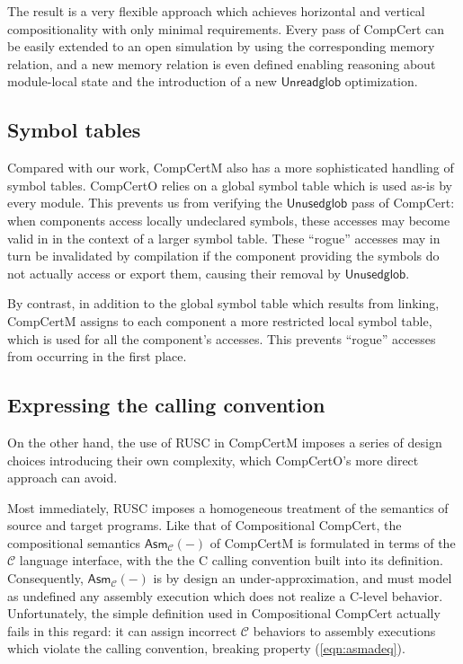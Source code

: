 \documentclass[sigplan,screen,review]{acmart}
\newcommand{\kw}[1]{\ensuremath{ \mathsf{#1} }}
\newenvironment{optional}{}{}
\begin{document}
\begin{optional}
The result is a very flexible approach
which achieves horizontal and vertical compositionality
with only minimal requirements.
Every pass of CompCert can be easily
extended to an open simulation
by using the corresponding memory relation,
and a new memory relation is even defined
enabling reasoning about module-local state
and the introduction of a new \kw{Unreadglob} optimization.


\subsection{Symbol tables} %

Compared with our work,
CompCertM also has a more sophisticated handling
of symbol tables.
CompCertO relies on a global symbol table
which is used as-is by every module.
This prevents us
from verifying the \kw{Unusedglob} pass of CompCert:
when components access locally undeclared symbols,
these accesses may become valid in
in the context of a larger symbol table.
These ``rogue'' accesses may in turn be invalidated by compilation
if the component providing the symbols
do not actually access or export them,
causing their removal by \kw{Unusedglob}.

By contrast,
in addition to the global symbol table which results from linking,
CompCertM assigns to each component
a more restricted local symbol table,
which is used for all the component's accesses.
This prevents ``rogue'' accesses
from occurring in the first place.


\subsection{Expressing the calling convention} %

On the other hand,
the use of RUSC in CompCertM imposes a series of design choices
introducing their own complexity,
which CompCertO's more direct approach can avoid.

Most immediately,
RUSC imposes a homogeneous
treatment of the semantics of source and target programs.
Like that of Compositional CompCert,
the compositional semantics $\kw{Asm}_\mathcal{C}(-)$
of CompCertM
is formulated in terms of the $\mathcal{C}$ language interface,
with the the C calling convention built into its definition.
Consequently, $\kw{Asm}_\mathcal{C}(-)$ is by design an under-approximation,
and must model as undefined any assembly execution
which does not realize a C-level behavior.
Unfortunately,
the simple definition used in Compositional CompCert
actually fails in this regard:
it can assign incorrect $\mathcal{C}$ behaviors
to assembly executions which violate the calling convention,
breaking property (\ref{eqn:asmadeq}).


\end{optional}
\end{document}
